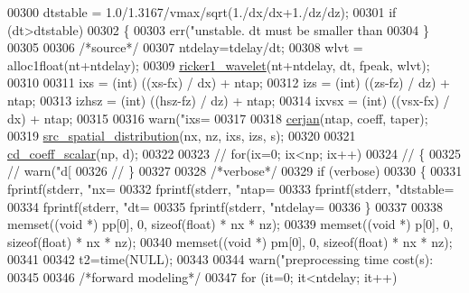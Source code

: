 \begin{DoxyCode}
{{{{{00300     dtstable = 1.0/1.3167/vmax/sqrt(1./dx/dx+1./dz/dz);
00301     \textcolor{keywordflow}{if} (dt>dtstable)
00302     \{
00303         err(\textcolor{stringliteral}{"unstable. dt must be smaller than %
00304     \}
00305 
00306     \textcolor{comment}{/*source*/}
00307     ntdelay=tdelay/dt;
00308     wlvt = alloc1float(nt+ntdelay);
00309     \hyperlink{a00002_a6b20993ec01a368bf2e7936b5b22f1d7}{ricker1\_wavelet}(nt+ntdelay, dt, fpeak, wlvt);
00310 
00311     ixs = (int) ((xs-fx) / dx) + ntap;
00312     izs = (int) ((zs-fz) / dz) + ntap;
00313     izhsz = (int) ((hsz-fz) / dz) + ntap;
00314     ixvsx = (int) ((vsx-fx) / dx) + ntap;
00315 
00316     warn(\textcolor{stringliteral}{"ixs=%
00317 
00318     \hyperlink{a00002_a77f8852395acfbe8480c185d9a6af713}{cerjan}(ntap, coeff, taper);
00319     \hyperlink{a00002_a97972f13a27a253327d118dc9a7559c8}{src\_spatial\_distribution}(nx, nz, ixs, izs, s);
00320 
00321     \hyperlink{a00002_a334ef00cfa7f725b18826a364b9151d5}{cd\_coeff\_scalar}(np, d);
00322 
00323 \textcolor{comment}{//    for(ix=0; ix<np; ix++)}
00324 \textcolor{comment}{//    \{}
00325 \textcolor{comment}{//        warn("d[%
00326 \textcolor{comment}{//    \}}
00327 
00328     \textcolor{comment}{/*verbose*/}
00329     \textcolor{keywordflow}{if} (verbose)
00330     \{
00331         fprintf(stderr, \textcolor{stringliteral}{"nx=%
00332         fprintf(stderr, \textcolor{stringliteral}{"ntap=%
00333         fprintf(stderr, \textcolor{stringliteral}{"dtstable=%
00334         fprintf(stderr, \textcolor{stringliteral}{"dt=%
00335         fprintf(stderr, \textcolor{stringliteral}{"ntdelay=%
00336     \}
00337 
00338     memset((\textcolor{keywordtype}{void} *) pp[0], 0, \textcolor{keyword}{sizeof}(\textcolor{keywordtype}{float}) * nx * nz);
00339     memset((\textcolor{keywordtype}{void} *) p[0], 0, \textcolor{keyword}{sizeof}(\textcolor{keywordtype}{float}) * nx * nz);
00340     memset((\textcolor{keywordtype}{void} *) pm[0], 0, \textcolor{keyword}{sizeof}(\textcolor{keywordtype}{float}) * nx * nz);
00341 
00342     t2=time(NULL);
00343 
00344     warn(\textcolor{stringliteral}{"preprocessing time cost(s):%
00345 
00346     \textcolor{comment}{/*forward modeling*/}
00347     \textcolor{keywordflow}{for} (it=0; it<ntdelay; it++)
}}}}}}}}}}}}}}
\end{DoxyCode}
